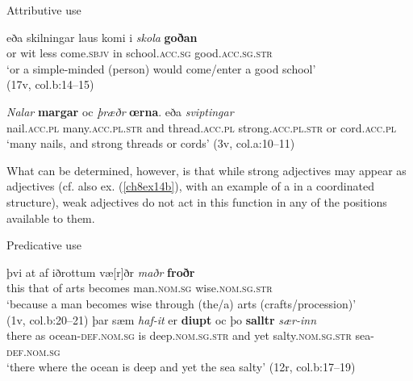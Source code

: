 \documentclass[output=paper,colorlinks,citecolor=brown]{langscibook}
\begin{document}
\begin{exe}
\ex\label{ch8ex13}Attributive use
\begin{xlist}
\ex\label{ch8ex13a}
\gll eða skilningar laus komi  i \textit{skola} \textbf{goðan }\\
or wit less come.\textsc{sbjv} in school.\textsc{acc.sg} good.\textsc{acc.sg.str}\\
\glt `or a simple-minded (person) would come/enter a good school'\\(17v, col.b:14--15)

\ex\label{ch8ex13b}
\gll \textit{Nalar} \textbf{margar} oc \textit{þræðr} \textbf{œrna}. eða \textit{sviptingar} \\
nail.\textsc{acc.pl} many.\textsc{acc.pl.str} and thread.\textsc{acc.pl} strong.\textsc{acc.pl.str} or cord.\textsc{acc.pl}\\
\glt `many nails, and strong threads or cords' (3v, col.a:10--11)
\end{xlist}
\end{exe}

What can be determined, however, is that while strong adjectives may
appear as  adjectives (cf. also ex. (\ref{ch8ex14b}), with an example of a
   in a coordinated structure), weak
adjectives do not act in this function in any of the positions available
to them.
\pagebreak
\begin{exe}
\ex\label{ch8ex14}Predicative use
\begin{xlist}
\ex\label{ch8ex14a}
\gll þvi at af iðrottum væ{[}r{]}ðr \textit{maðr} \textbf{froðr} \\
this that of arts becomes man.\textsc{nom.sg} wise.\textsc{nom.sg.str}\\
\glt `because a man becomes wise through (the/a) arts (crafts/procession)'\\
(1v, col.b:20--21)
\ex\label{ch8ex14b}
\gll  þar sæm \textit{haf-it} er \textbf{diupt} oc þo \textbf{salltr} \textit{sær-inn} \\
there as ocean-\textsc{def.nom.sg} is deep.\textsc{nom.sg.str} and yet salty.\textsc{nom.sg.str} sea-\textsc{def.nom.sg}\\
\glt `there where the ocean is deep and yet the sea salty' (12r, col.b:17--19)
\end{xlist}
\end{exe}
\end{document}
